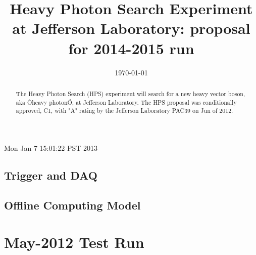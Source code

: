 \documentclass[prc,12pt]{revtex4}
\begin{document}
{\color{red} Mon Jan  7 15:01:22 PST 2013 } %

\title{\bf\large{Heavy Photon Search Experiment at Jefferson Laboratory: proposal for 2014-2015 run}}


\date{\today}

\begin{abstract}
\clearpage

The Heavy Photon Search (HPS) experiment will search for a new heavy vector boson, aka Òheavy photonÓ, at Jefferson Laboratory. The HPS proposal was conditionally approved, C1, with "A" rating by the Jefferson Laboratory PAC39  on Jun of 2012. 

\end{abstract}

\maketitle
\clearpage

\tableofcontents
\clearpage






\clearpage





\clearpage






\clearpage


\clearpage


\clearpage


\clearpage

\subsection{Trigger and DAQ }


\subsection{Offline Computing Model}


\section{May-2012 Test Run}
\label{sec:testrun2012}

\clearpage
\end{document}
